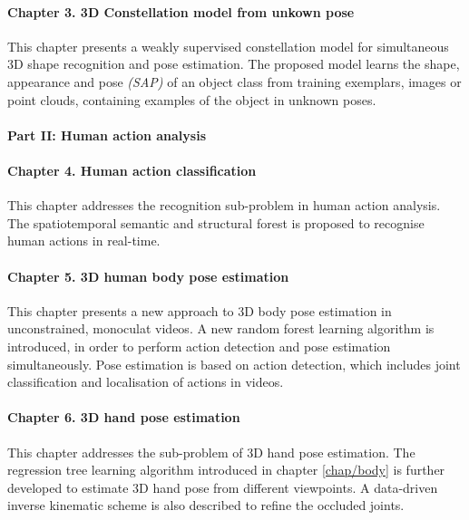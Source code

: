 \paragraph{Chapter 3. 3D Constellation model from unkown pose}
This chapter presents a weakly supervised constellation model for simultaneous 3D shape recognition and pose estimation. 
The proposed model learns the shape, appearance and pose \emph{(SAP)} of an object class from training exemplars, \eg images or point clouds, containing examples of the object in unknown poses.  

\paragraph{Part II: Human action analysis}


\paragraph{Chapter 4. Human action classification} 
This chapter addresses the recognition sub-problem in human action analysis. The spatiotemporal semantic and structural forest is proposed to recognise human actions in real-time.    

\paragraph{Chapter 5. 3D human body pose estimation} 
This chapter presents a new approach to 3D body pose estimation in unconstrained, monoculat videos. 
A new random forest learning algorithm is introduced, in order to perform action detection and pose estimation simultaneously. 
Pose estimation is based on action detection, which includes joint classification and localisation of actions in videos. 

\paragraph{Chapter 6. 3D hand pose estimation} 
This chapter addresses the sub-problem of 3D hand pose estimation. 
The regression tree learning algorithm introduced in chapter \ref{chap/body} is further developed to estimate 3D hand pose from different viewpoints. 
A data-driven inverse kinematic scheme is also described to refine the occluded joints.
